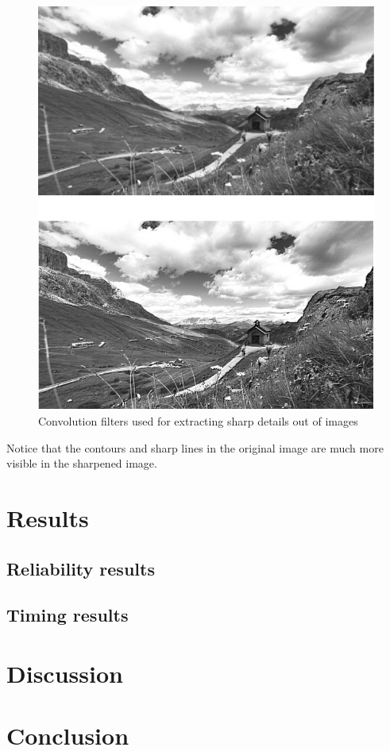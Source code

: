 \begin{figure}[H]
  \includegraphics[scale=0.5]{fig/sharpened_image.png}
  \centering
  \caption{Convolution filters used for extracting sharp details out of images}
  \label{fig:sharpened_image}
\end{figure}

Notice that the contours and sharp lines in the original image are much more visible in the sharpened image.

\section{Results}
\subsection{Reliability results}
\subsection{Timing results}

\section{Discussion}

\section{Conclusion}
